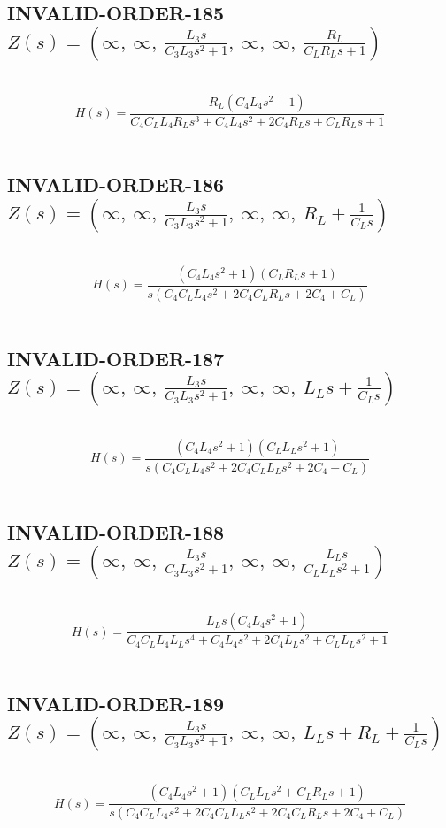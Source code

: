 \documentclass{article}
\begin{document}
\subsection{INVALID-ORDER-185 $Z(s) = \left( \infty, \  \infty, \  \frac{L_{3} s}{C_{3} L_{3} s^{2} + 1}, \  \infty, \  \infty, \  \frac{R_{L}}{C_{L} R_{L} s + 1}\right)$ } \ 
\textbf{\[H(s) = \frac{R_{L} \left(C_{4} L_{4} s^{2} + 1\right)}{C_{4} C_{L} L_{4} R_{L} s^{3} + C_{4} L_{4} s^{2} + 2 C_{4} R_{L} s + C_{L} R_{L} s + 1}\] } \ 
\subsection{INVALID-ORDER-186 $Z(s) = \left( \infty, \  \infty, \  \frac{L_{3} s}{C_{3} L_{3} s^{2} + 1}, \  \infty, \  \infty, \  R_{L} + \frac{1}{C_{L} s}\right)$ } \ 
\textbf{\[H(s) = \frac{\left(C_{4} L_{4} s^{2} + 1\right) \left(C_{L} R_{L} s + 1\right)}{s \left(C_{4} C_{L} L_{4} s^{2} + 2 C_{4} C_{L} R_{L} s + 2 C_{4} + C_{L}\right)}\] } \ 
\subsection{INVALID-ORDER-187 $Z(s) = \left( \infty, \  \infty, \  \frac{L_{3} s}{C_{3} L_{3} s^{2} + 1}, \  \infty, \  \infty, \  L_{L} s + \frac{1}{C_{L} s}\right)$ } \ 
\textbf{\[H(s) = \frac{\left(C_{4} L_{4} s^{2} + 1\right) \left(C_{L} L_{L} s^{2} + 1\right)}{s \left(C_{4} C_{L} L_{4} s^{2} + 2 C_{4} C_{L} L_{L} s^{2} + 2 C_{4} + C_{L}\right)}\] } \ 
\subsection{INVALID-ORDER-188 $Z(s) = \left( \infty, \  \infty, \  \frac{L_{3} s}{C_{3} L_{3} s^{2} + 1}, \  \infty, \  \infty, \  \frac{L_{L} s}{C_{L} L_{L} s^{2} + 1}\right)$ } \ 
\textbf{\[H(s) = \frac{L_{L} s \left(C_{4} L_{4} s^{2} + 1\right)}{C_{4} C_{L} L_{4} L_{L} s^{4} + C_{4} L_{4} s^{2} + 2 C_{4} L_{L} s^{2} + C_{L} L_{L} s^{2} + 1}\] } \ 
\subsection{INVALID-ORDER-189 $Z(s) = \left( \infty, \  \infty, \  \frac{L_{3} s}{C_{3} L_{3} s^{2} + 1}, \  \infty, \  \infty, \  L_{L} s + R_{L} + \frac{1}{C_{L} s}\right)$ } \ 
\textbf{\[H(s) = \frac{\left(C_{4} L_{4} s^{2} + 1\right) \left(C_{L} L_{L} s^{2} + C_{L} R_{L} s + 1\right)}{s \left(C_{4} C_{L} L_{4} s^{2} + 2 C_{4} C_{L} L_{L} s^{2} + 2 C_{4} C_{L} R_{L} s + 2 C_{4} + C_{L}\right)}\] } \ 
\end{document}
